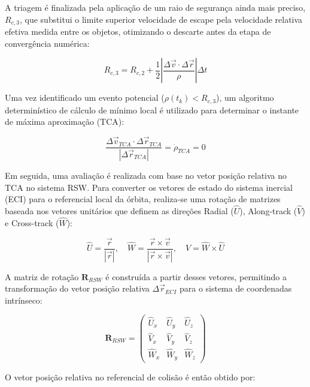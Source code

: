 A triagem é finalizada pela aplicação de um raio de segurança ainda mais preciso, $R_{c,3}$, que substitui o limite superior velocidade de escape pela velocidade relativa efetiva medida entre os objetos, otimizando o descarte antes da etapa de convergência numérica:

\begin{equation}
    R_{c,3} = R_{c,2} + \frac{1}{2} \left| \frac{\Delta \vec{v} \cdot \Delta \vec{r}}{\rho} \right| \Delta t
\end{equation}

Uma vez identificado um evento potencial ($\rho(t_k) < R_{c,3}$), um algoritmo determinístico de cálculo de mínimo local é utilizado para determinar o instante de máxima aproximação (TCA):

\begin{equation}
    \frac{\Delta \vec{v}_{TCA} \cdot \Delta \vec{r}_{TCA}}{|\Delta \vec{r}_{TCA}|} = \dot{\rho}_{TCA} = 0
\end{equation}

Em seguida, uma avaliação é realizada com base no vetor posição relativa no TCA no sistema RSW. Para converter os vetores de estado do sistema inercial (ECI) para o referencial local da órbita, realiza-se uma rotação de matrizes baseada nos vetores unitários que definem as direções Radial ($\hat{U}$), Along-track ($\hat{V}$) e Cross-track ($\hat{W}$):

\begin{equation}
    \hat{U} = \frac{\vec{r}}{|\vec{r}|}, \quad \hat{W} = \frac{\vec{r} \times \vec{v}}{|\vec{r} \times \vec{v}|}, \quad \hat{V} = \hat{W} \times \hat{U}
\end{equation}

A matriz de rotação $\mathbf{R}_{RSW}$ é construída a partir desses vetores, permitindo a transformação do vetor posição relativa $\Delta \vec{r}_{ECI}$ para o sistema de coordenadas intrínseco:

\begin{equation}
    \mathbf{R}_{RSW} = \begin{pmatrix} 
    \hat{U}_x & \hat{U}_y & \hat{U}_z \\ 
    \hat{V}_x & \hat{V}_y & \hat{V}_z \\ 
    \hat{W}_x & \hat{W}_y & \hat{W}_z 
    \end{pmatrix}
\end{equation}

O vetor posição relativa no referencial de colisão é então obtido por:

